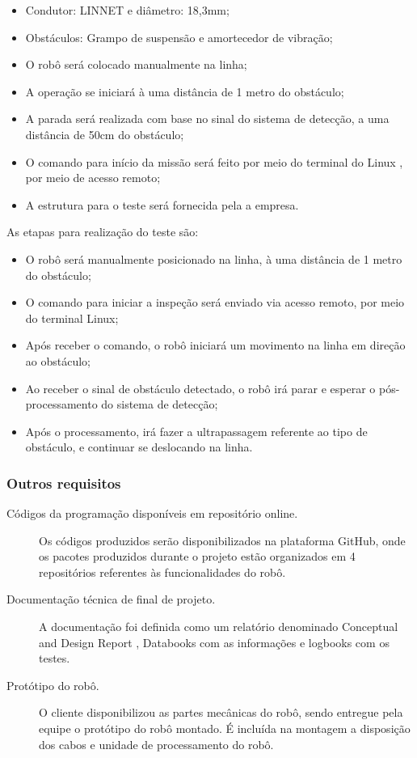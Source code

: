 \begin{itemize}
	\item Condutor: LINNET e diâmetro: 18,3mm;
	\item Obstáculos: Grampo de suspensão e amortecedor de vibração;
	\item O robô será colocado manualmente na linha;
	\item A operação se iniciará à uma distância de 1 metro do obstáculo;
	\item A parada será realizada com base no sinal do sistema de detecção, a uma distância de 50cm do obstáculo;
	\item O comando para início da missão será feito por meio do terminal do Linux , por meio de acesso remoto;
	\item A estrutura para o teste será fornecida pela a empresa.
\end{itemize}

As etapas para realização do teste são:

\begin{itemize}
	\item O robô será manualmente posicionado na linha, à uma distância de 1 metro do obstáculo;
	\item O comando para iniciar a inspeção será enviado via acesso remoto, por meio do terminal Linux;
	\item Após receber o comando, o robô iniciará um movimento na linha em direção ao obstáculo;
	\item Ao receber o sinal de obstáculo detectado, o robô irá parar e esperar o pós-processamento do sistema de detecção;
	\item Após o processamento, irá fazer a ultrapassagem referente ao tipo de obstáculo, e continuar se deslocando na linha.
\end{itemize}

\subsubsection{Outros requisitos}

\begin{description}
	\item [Códigos da programação disponíveis em repositório online.] Os códigos produzidos serão disponibilizados na plataforma GitHub, onde os pacotes produzidos durante o projeto estão organizados em 4 repositórios referentes às funcionalidades do robô.
	\item [Documentação técnica de final de projeto.] A documentação foi definida como um relatório denominado Conceptual and Design Report , Databooks com as informações e logbooks com os testes.
	\item [Protótipo do robô.] O cliente disponibilizou as partes mecânicas do robô, sendo entregue pela equipe o protótipo do robô montado. É incluída na montagem a disposição dos cabos e unidade de processamento do robô.
\end{description}
